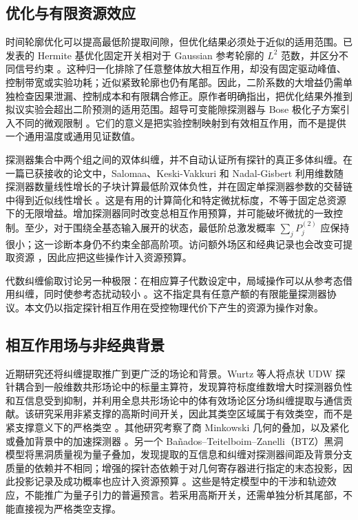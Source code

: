\documentclass[UTF8,11pt,a4paper,fontset=none]{ctexart}
\begin{document}
\subsection{优化与有限资源效应}
时间轮廓优化可以提高最低阶提取间隙，但优化结果必须处于近似的适用范围。已发表的 Hermite 基优化固定开关相对于 Gaussian 参考轮廓的 $L^2$ 范数，并区分不同信号约束 \cite{MoroteBalboaPerche2026}。这种归一化排除了任意整体放大相互作用，却没有固定驱动峰值、控制带宽或实验功耗；近似紧致轮廓也仍有尾部。因此，二阶系数的大增益仍需单独检查因果泄漏、控制成本和有限耦合修正。原作者明确指出，把优化结果外推到拟议实验会超出二阶预测的适用范围。超导可变能隙探测器与 Bose 极化子方案引入不同的微观限制 \cite{TeixidoBonfill2026,PercheGozzini2026}。它们的意义是把实验控制映射到有效相互作用，而不是提供一个通用温度或通用见证数值。

探测器集合中两个组之间的双体纠缠，并不自动认证所有探针的真正多体纠缠。在一篇已获接收的论文中，Salomaa、Keski-Vakkuri 和 Nadal-Gisbert 利用维数随探测器数量线性增长的子块计算最低阶双体负性，并在固定单探测器参数的交替链中得到近似线性增长 \cite{SalomaaKeskiVakkuriNadalGisbert2026}。这是有用的计算简化和特定微扰标度，不等于固定总资源下的无限增益。增加探测器同时改变总相互作用预算，并可能破坏微扰的一致控制。至少，对于围绕全基态输入展开的状态，最低阶总激发概率 $\sum_jP_j^{(2)}$ 应保持很小；这一诊断本身仍不约束全部高阶项。访问额外场区和经典记录也会改变可提取资源 \cite{KlcoBeck2023}，因此应把这些操作计入资源预算。

代数纠缠偷取讨论另一种极限：在相应算子代数设定中，局域操作可以从参考态借用纠缠，同时使参考态扰动较小 \cite{vanLuijk2024,vanLuijk2025}。这不指定具有任意产额的有限能量探测器协议。本文仍以指定探针相互作用在受控物理代价下产生的资源为操作对象。

\subsection{相互作用场与非经典背景}
近期研究还将纠缠提取推广到更广泛的场论和背景。Wurtz 等人将点状 UDW 探针耦合到一般维数共形场论中的标量主算符，发现算符标度维数增大时探测器负性和互信息受到抑制，并利用全息共形场论中的体有效场论区分场纠缠提取与通信贡献。该研究采用非紧支撑的高斯时间开关，因此其类空区域属于有效类空，而不是紧支撑意义下的严格类空 \cite{WurtzLimaMyersMartinez2026}。其他研究考察了商 Minkowski 几何的叠加，以及紧化或叠加背景中的加速探测器 \cite{ChakrabortyHacklZych2025,PoopathysankarHacklChakraborty2026}。另一个 Bañados--Teitelboim--Zanelli（BTZ）黑洞模型将黑洞质量视为量子叠加，发现提取的互信息和纠缠对探测器间距及背景分支质量的依赖并不相同；增强的探针态依赖于对几何寄存器进行指定的末态投影，因此投影记录及成功概率也应计入资源预算 \cite{TangLiuLiuWang2026}。这些是特定模型中的干涉和轨迹效应，不能推广为量子引力的普遍预言。若采用高斯开关，还需单独分析其尾部，不能直接视为严格类空支撑。
\end{document}
